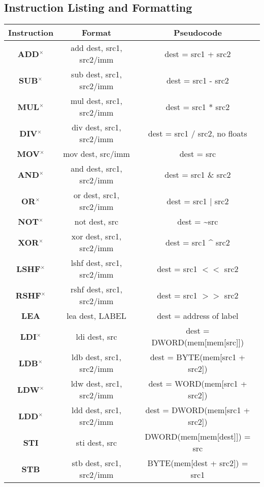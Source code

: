 \documentclass{article}
\newcommand*\scc[1]{{#1}\textbf{$^\times$}}
\begin{document}
\begin{tableofcontents}
\section{\Huge Instruction Listing and Formatting}
\label{sec:instructionList}
\begin{center}
\begin{tabular}{|c|c|c|}
\hline
\textbf{Instruction} & \textbf{Format} & \textbf{Pseudocode} \\
\hline
\textbf{\scc{ADD}} & add dest, src1, src2/imm & dest = src1 + src2 \\
\hline
\textbf{\scc{SUB}} & sub dest, src1, src2/imm & dest = src1 - src2 \\
\hline
\textbf{\scc{MUL}} & mul dest, src1, src2/imm & dest = src1 * src2 \\
\hline
\textbf{\scc{DIV}} & div dest, src1, src2/imm & dest = src1 / src2, no floats \\
\hline
\textbf{\scc{MOV}} & mov dest, src/imm & dest = src \\
\hline
\textbf{\scc{AND}} & and dest, src1, src2/imm & dest = src1 \& src2 \\
\hline
\textbf{\scc{OR}} & or dest, src1, src2/imm & dest = src1 $|$ src2 \\
\hline
\textbf{\scc{NOT}} & not dest, src & dest = \~{}src \\
\hline
\textbf{\scc{XOR}} & xor dest, src1, src2/imm & dest = src1 \^{} src2 \\
\hline 
\textbf{\scc{LSHF}} & lshf dest, src1, src2/imm & dest = src1 $<$$<$ src2 \\
\hline
\textbf{\scc{RSHF}} & rshf dest, src1, src2/imm & dest = src1 $>$$>$ src2 \\
\hline
\textbf{LEA} & lea dest, LABEL & dest = address of label \\
\hline
\textbf{\scc{LDI}} & ldi dest, src & dest = DWORD(mem[mem[src]]) \\
\hline
\textbf{\scc{LDB}} & ldb dest, src1, src2/imm & dest = BYTE(mem[src1 + src2]) \\
\hline
\textbf{\scc{LDW}} & ldw dest, src1, src2/imm & dest = WORD(mem[src1 + src2]) \\
\hline
\textbf{\scc{LDD}} & ldd dest, src1, src2/imm & dest = DWORD(mem[src1 + src2]) \\
\hline
\textbf{STI} & sti dest, src & DWORD(mem[mem[dest]]) = src \\
\hline
\textbf{STB} & stb dest, src1, src2/imm & BYTE(mem[dest + src2]) = src1 \\
\hline

\end{tabular}
\end{center}
\end{tableofcontents}
\end{document}
